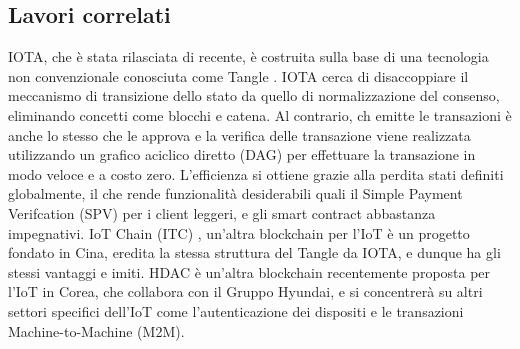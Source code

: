 \documentclass[a4paper,12pt,draft]{article}
\begin{document}
\subsection{Lavori correlati}
IOTA, che è stata rilasciata di recente, è costruita sulla base di una tecnologia non convenzionale conosciuta come Tangle \cite{24}. IOTA cerca di disaccoppiare il meccanismo di transizione dello stato da quello di normalizzazione del consenso, eliminando concetti come blocchi e catena. Al contrario, ch emitte le transazioni è anche lo stesso che le approva e la verifica delle transazione viene realizzata utilizzando un grafico aciclico diretto (DAG) per effettuare la transazione in modo veloce e a costo zero. L'efficienza si ottiene grazie alla perdita stati definiti globalmente, il che rende funzionalità desiderabili quali il Simple Payment Verifcation (SPV) per i client leggeri, e gli smart contract abbastanza impegnativi. IoT Chain (ITC) \cite{16}, un'altra blockchain per l'IoT è un progetto fondato in Cina, eredita la stessa struttura del Tangle da IOTA, e dunque ha gli stessi vantaggi e imiti. HDAC \cite{13} è un'altra blockchain recentemente proposta per l'IoT in Corea, che collabora con il Gruppo Hyundai, e si concentrerà su altri settori specifici dell'IoT come l'autenticazione dei dispositi e le transazioni Machine-to-Machine (M2M).

\pagebreak




\end{document}
